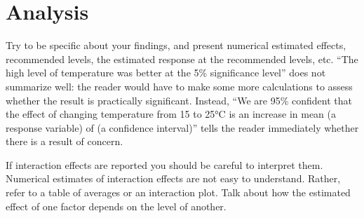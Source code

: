 \documentclass[12pt,a4paper]{article}
\begin{document}





\section{Analysis}\label{section3}


Try to be specific about your findings, and present numerical
estimated effects, recommended levels, the estimated response at the recommended levels,
etc. ``The high level of temperature was better at the 5\% significance level'' does not
summarize well: the reader would have to make some more calculations to assess whether
the result is practically significant. Instead, ``We are 95\% confident that the effect of
changing temperature from 15 to 25°C is an increase in mean (a response variable) of (a
confidence interval)'' tells the reader immediately whether there is a result of concern.

If interaction effects are reported you should be careful to interpret them. Numerical
estimates of interaction effects are not easy to understand. Rather, refer to a table of
averages or an interaction plot. Talk about how the estimated effect of one factor depends
on the level of another.
\end{document}

